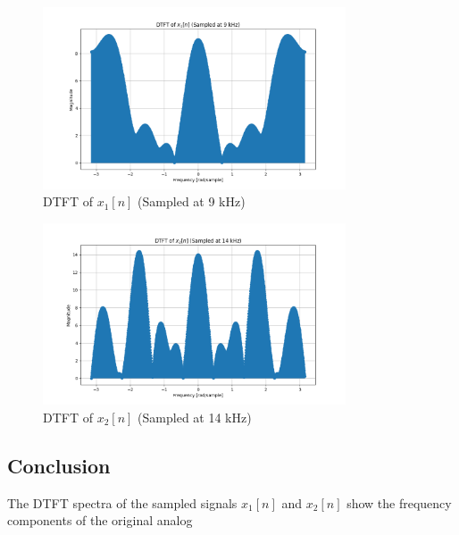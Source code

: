 \begin{figure}[h]
    \centering
    \includegraphics[width=0.8\textwidth]{fig/ex1_b_dtft_x1.png}
    \caption{DTFT of $x_1[n]$ (Sampled at 9 kHz)}
    \label{fig:ex1_b_dtft_x1}
\end{figure}

\begin{figure}[h]
    \centering
    \includegraphics[width=0.8\textwidth]{fig/ex1_b_dtft_x2.png}
    \caption{DTFT of $x_2[n]$ (Sampled at 14 kHz)}
    \label{fig:ex1_b_dtft_x2}
\end{figure}

\subsection*{Conclusion}
The DTFT spectra of the sampled signals \( x_1[n] \) and \( x_2[n] \) show the frequency components of the original analog
